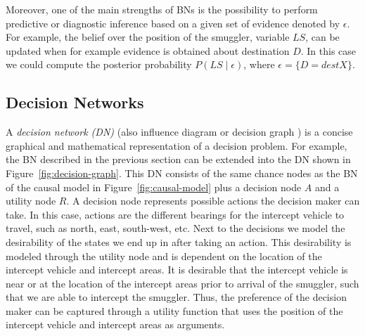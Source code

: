 \documentclass[conference]{IEEEtran}
\begin{document}
  
Moreover, one of the main strengths of BNs is the possibility to perform predictive or diagnostic inference based on a given set of evidence denoted by $\epsilon$. For example, the belief over the position of the smuggler, \ie variable $LS$, can be updated when for example evidence is obtained about destination $D$. In this case we could compute the posterior probability $P(LS\mid \epsilon)$, where $\epsilon = \{D=destX\}$.







\subsection{Decision Networks}\label{sec:decision-networks}

A {\em decision network (DN)} (also influence diagram or decision graph \cite{russell02bn,howard84rpada,jensen07book}) is a concise graphical and mathematical representation of a decision problem. For example, the BN described in the previous section can be extended into the DN shown in Figure~\ref{fig:decision-graph}. This DN consists of the same chance nodes as the BN of the causal model in Figure~\ref{fig:causal-model} plus a decision node $A$ and a utility node $R$. A decision node represents possible actions the decision maker can take. In this case, actions are the different bearings for the intercept vehicle to travel, such as north, east, south-west, etc. Next to the decisions we model the desirability of the states we end up in after taking an action. This desirability is modeled through the utility node and is dependent on the location of the intercept vehicle and intercept areas. It is desirable that the intercept vehicle is near or at the location of the intercept areas prior to arrival of the smuggler, such that we are able to intercept the smuggler. Thus, the preference of the decision maker can be captured through a utility function that uses the position of the intercept vehicle and intercept areas as arguments.
\end{document}

